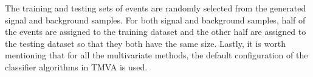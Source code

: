\documentclass[main]{subfiles} %
\begin{document}
The training and testing sets of events are randomly selected from the generated signal and background samples. For both signal and background samples, half of the events are assigned to the training dataset and the other half are assigned to the testing dataset so that they both have the same size. Lastly, it is worth mentioning that for all the multivariate methods, the default configuration of the classifier algorithms in \textsc{TMVA} is used. 




















\biblio
\end{document}
